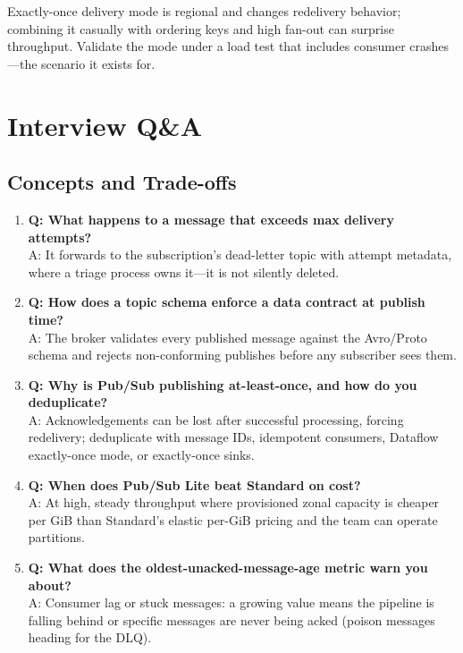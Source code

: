 \begin{pitfall}
Exactly-once delivery mode is regional and changes redelivery behavior; combining it casually with ordering keys and high fan-out can surprise throughput. Validate the mode under a load test that includes consumer crashes---the scenario it exists for.
\end{pitfall}

\section{Interview Q\&A}
\subsection{Concepts and Trade-offs}
\begin{enumerate}
    \item \textbf{Q: What happens to a message that exceeds max delivery attempts?}\\
    A: It forwards to the subscription's dead-letter topic with attempt metadata, where a triage process owns it---it is not silently deleted.

    \item \textbf{Q: How does a topic schema enforce a data contract at publish time?}\\
    A: The broker validates every published message against the Avro/Proto schema and rejects non-conforming publishes before any subscriber sees them.

    \item \textbf{Q: Why is Pub/Sub publishing at-least-once, and how do you deduplicate?}\\
    A: Acknowledgements can be lost after successful processing, forcing redelivery; deduplicate with message IDs, idempotent consumers, Dataflow exactly-once mode, or exactly-once sinks.

    \item \textbf{Q: When does Pub/Sub Lite beat Standard on cost?}\\
    A: At high, steady throughput where provisioned zonal capacity is cheaper per GiB than Standard's elastic per-GiB pricing and the team can operate partitions.

    \item \textbf{Q: What does the oldest-unacked-message-age metric warn you about?}\\
    A: Consumer lag or stuck messages: a growing value means the pipeline is falling behind or specific messages are never being acked (poison messages heading for the DLQ).
\end{enumerate}

